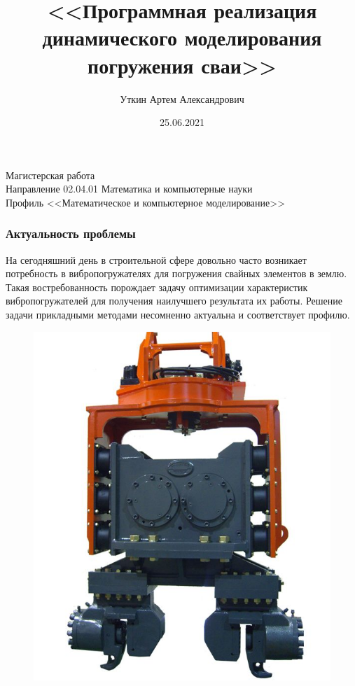 \documentclass[10pt, pdf, hyperref={unicode}]{beamer}
\title{<<Программная реализация динамического моделирования погружения сваи>>}
\date{25.06.2021}
\author{Уткин Артем Александрович}
\begin{document}
    \begin{frame} %
        \titlepage
        \begin{center}
            Магистерская работа\\
            Направление 02.04.01 Математика и компьютерные науки\\
            Профиль <<Математическое и компьютерное моделирование>>
        \end{center}
    \end{frame}


    \begin{frame}
        \frametitle{Актуальность проблемы}
        \begin{center}
            \begin{minipage}[h]{0.97\linewidth}
                \begin{minipage}[h]{0.95\linewidth}
                    На сегодняшний день в строительной сфере довольно часто возникает потребность в вибропогружателях для погружения свайных элементов в землю.
                    \newline
                    Такая востребованность порождает задачу оптимизации характеристик вибропогружателей для получения наилучшего результата их работы.
                    \newline
                    Решение задачи прикладными методами несомненно актуальна и соответствует профилю.
                \end{minipage}
                \begin{minipage}[h]{0.22\linewidth}
                    \begin{figure}[h]
                        \centering
                        \includegraphics[width=1\linewidth]{../img/photo_1.jpg}

\end{figure}
\end{minipage}
\end{minipage}
\end{center}
\end{frame}
\end{document}

